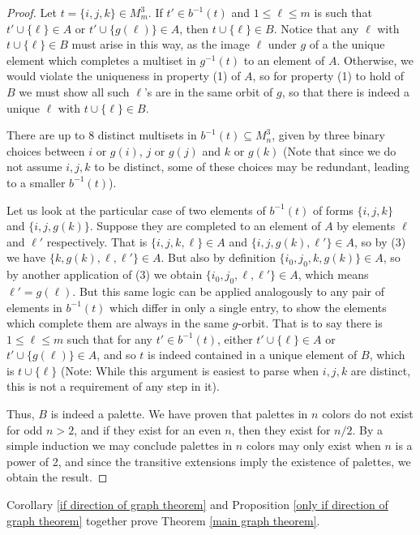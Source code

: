 \documentclass{amsart}
\newcommand{\set}[1]{\{#1 \}}
\newcommand{\inv}{^{-1}}
\begin{document}
\begin{proof}
    Let $t = \{i, j, k\} \in M_m^3$. If $t' \in b\inv(t)$ and $1 \leq \ell \leq m$ is such that $t' \cup \set{\ell} \in A$ or $t' \cup \set{g(\ell)} \in A$, then $t \cup \set{\ell} \in B$. Notice that any $\ell$ with $t \cup \set{\ell} \in B$ must arise in this way, as the image $\ell$ under $g$ of a the unique element which completes a multiset in $g\inv(t)$ to an element of $A$. Otherwise, we would violate the uniqueness in property (1) of $A$, so for property (1) to hold of $B$ we must show all such $\ell$'s are in the same orbit of $g$, so that there is indeed a unique $\ell$ with $t \cup \set{\ell} \in B$.

    There are up to 8 distinct multisets in $b\inv(t) \subseteq M_n^3$, given by three binary choices between $i$ or $g(i)$, $j$ or $g(j)$ and $k$ or $g(k)$ (Note that since we do not assume $i, j, k$ to be distinct, some of these choices may be redundant, leading to a smaller $b\inv(t)$).
        
    Let us look at the particular case of two elements of $b\inv(t)$ of forms  $\{i, j, k\}$ and $\{i, j, g(k)\}$. Suppose they are completed to an element of $A$ by elements $\ell$ and $\ell'$ respectively. That is $\{i, j, k, \ell\} \in A$ and $\{i, j, g(k), \ell'\} \in A$, so by (3) we have $\{k, g(k), \ell, \ell'\} \in A$. But also by definition $\{i_0, j_0, k, g(k)\} \in A$, so by another application of (3) we obtain $\{i_0, j_0, \ell, \ell'\} \in A$, which means $\ell' = g(\ell)$. But this same logic can be applied analogously to any pair of elements in $b^{-1}(t)$ which differ in only a single entry, to show the elements which complete them are always in the same $g$-orbit. That is to say there is $1\leq\ell \leq m$ such that for any $t' \in b\inv(t)$, either $t' \cup \set{\ell} \in A$ or $t' \cup \set{g(\ell)} \in A$, and so $t$ is indeed contained in a unique element of $B$, which is $t \cup \set{\ell}$ (Note: While this argument is easiest to parse when $i, j, k$ are distinct, this is not a requirement of any step in it).

    Thus, $B$ is indeed a palette. We have proven that palettes in $n$ colors do not exist for odd $n >2$, and if they exist for an even $n$, then they exist for $n/2$. By a simple induction we may conclude palettes in $n$ colors may only exist when $n$ is a power of 2, and since the transitive extensions imply the existence of palettes, we obtain the result.

\end{proof}

Corollary \ref{if direction of graph theorem} and Proposition \ref{only if direction of graph theorem}
together prove Theorem \ref{main graph theorem}.
\end{document}
